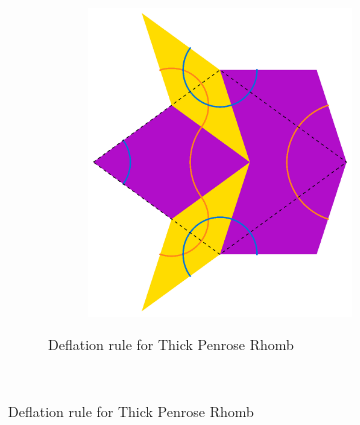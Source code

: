 \documentclass[]{article}
\begin{document}
\begin{figure}[H]
\begin{subfigure}[t]{\textwidth}
\begin{subfigure}[t]{0.4\textwidth}
                \includegraphics[scale=0.4]{RhombFatSub}
        \end{subfigure}
        \caption{Deflation rule for Thick Penrose Rhomb}
        \label{fig:RhombSubThick}
        \end{subfigure}
        ~ %
          

\end{figure}
\end{document}
